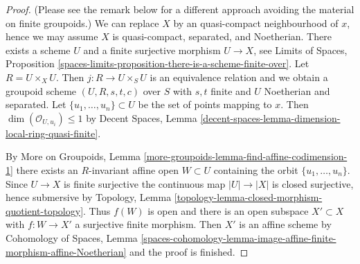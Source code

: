 \begin{proof}
(Please see the remark below for a different approach avoiding the material on
finite groupoids.) We can replace $X$ by an quasi-compact neighbourhood of
$x$, hence we may assume $X$ is quasi-compact, separated, and Noetherian.
There exists a scheme $U$ and a finite surjective morphism $U \to X$,
see Limits of Spaces, Proposition
\ref{spaces-limits-proposition-there-is-a-scheme-finite-over}.
Let $R = U \times_X U$. Then $j : R \to U \times_S U$ is an equivalence
relation and we obtain a groupoid scheme $(U, R, s, t, c)$ over $S$
with $s, t$ finite and $U$ Noetherian and separated.
Let $\{u_1, \ldots, u_n\} \subset U$ be the set of points mapping to $x$. 
Then $\dim(\mathcal{O}_{U, u_i}) \leq 1$ by
Decent Spaces, Lemma
\ref{decent-spaces-lemma-dimension-local-ring-quasi-finite}.

\medskip\noindent
By More on Groupoids, Lemma
\ref{more-groupoids-lemma-find-affine-codimension-1}
there exists an $R$-invariant affine open $W \subset U$ containing
the orbit $\{u_1, \ldots, u_n\}$. Since $U \to X$ is finite surjective
the continuous map $|U| \to |X|$ is closed surjective, hence
submersive by Topology, Lemma
\ref{topology-lemma-closed-morphism-quotient-topology}.
Thus $f(W)$ is open and there is an open subspace $X' \subset X$
with $f : W \to X'$ a surjective finite morphism.
Then $X'$ is an affine scheme by
Cohomology of Spaces, Lemma
\ref{spaces-cohomology-lemma-image-affine-finite-morphism-affine-Noetherian}
and the proof is finished.
\end{proof}

